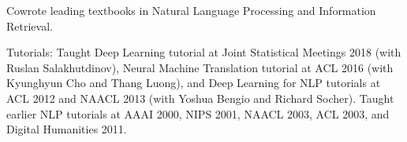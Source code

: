 \documentclass[11pt,letterpaper]{article}
\def\url#1{{\small\sf #1}}
\begin{document}
\begin{vita}
\begin{Products (other significant)}





\end{Products (other significant)}

\begin{Synergistic Activities}

\item Cowrote leading textbooks in Natural
  Language Processing and Information Retrieval.

\item Tutorials: Taught Deep Learning tutorial at Joint Statistical Meetings 2018 (with Ruslan Salakhutdinov),
Neural Machine Translation tutorial at ACL 2016 (with Kyunghyun Cho and Thang Luong), and 
Deep Learning for NLP tutorials at ACL 2012 and NAACL 2013 (with Yoshua Bengio and Richard Socher).
Taught earlier NLP tutorials at AAAI 2000, NIPS 2001, NAACL 2003, ACL 2003, and Digital Humanities 2011.


\end{Synergistic Activities}
\end{vita}
\end{document}
